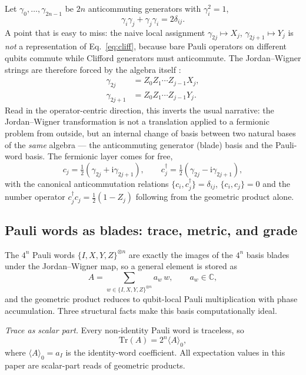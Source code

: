 \documentclass[11pt]{article}
\newcommand{\C}{\mathbb{C}}
\newcommand{\Tr}{\mathrm{Tr}}
\newcommand{\ii}{\mathrm{i}}
\begin{document}
Let $\gamma_0,\ldots,\gamma_{2n-1}$ be $2n$ anticommuting generators with $\gamma_i^2=1$,
\begin{equation}
    \gamma_i\gamma_j+\gamma_j\gamma_i=2\delta_{ij}.
    \label{eq:cliff}
\end{equation}
A point that is easy to miss: the naive local assignment $\gamma_{2j}\mapsto X_j$, $\gamma_{2j+1}\mapsto Y_j$ is \emph{not} a representation of Eq.~\eqref{eq:cliff}, because bare Pauli operators on different qubits commute while Clifford generators must anticommute.  The Jordan--Wigner strings are therefore forced by the algebra itself \cite{jordan1928}:
\begin{align}
    \gamma_{2j} &= Z_0 Z_1\cdots Z_{j-1}X_j,\\
    \gamma_{2j+1} &= Z_0 Z_1\cdots Z_{j-1}Y_j .
\end{align}
Read in the operator-centric direction, this inverts the usual narrative: the Jordan--Wigner transformation is not a translation applied to a fermionic problem from outside, but an internal change of basis between two natural bases of the \emph{same} algebra --- the anticommuting generator (blade) basis and the Pauli-word basis.  The fermionic layer comes for free,
\begin{equation}
    c_j = \tfrac{1}{2}(\gamma_{2j}+\ii\gamma_{2j+1}),\qquad
    c_j^\dagger = \tfrac{1}{2}(\gamma_{2j}-\ii\gamma_{2j+1}),
\end{equation}
with the canonical anticommutation relations $\{c_i,c_j^\dagger\}=\delta_{ij}$, $\{c_i,c_j\}=0$ and the number operator $c_j^\dagger c_j = \tfrac{1}{2}(1-Z_j)$ following from the geometric product alone.

\subsection{Pauli words as blades: trace, metric, and grade}

The $4^n$ Pauli words $\{I,X,Y,Z\}^{\otimes n}$ are exactly the images of the $4^n$ basis blades under the Jordan--Wigner map, so a general element is stored as
\begin{equation}
    A = \sum_{w\in\{I,X,Y,Z\}^{\otimes n}} a_w\, w,\qquad a_w\in\C,
\end{equation}
and the geometric product reduces to qubit-local Pauli multiplication with phase accumulation.  Three structural facts make this basis computationally ideal.

\emph{Trace as scalar part.}  Every non-identity Pauli word is traceless, so
\begin{equation}
    \Tr(A)=2^n\langle A\rangle_0,
    \label{eq:trace}
\end{equation}
where $\langle A\rangle_0=a_I$ is the identity-word coefficient.  All expectation values in this paper are scalar-part reads of geometric products.
\end{document}
